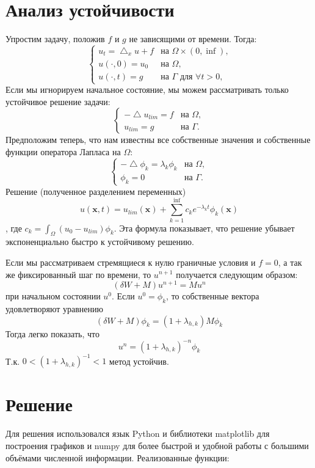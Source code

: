 \documentclass[paper=a4, fontsize=13pt]{scrartcl} %
\numberwithin{equation}{section} %
\numberwithin{figure}{section} %
\numberwithin{table}{section} %
\begin{document}
\section{Анализ устойчивости}
Упростим задачу, положив $f$ и $g$ не зависящими от времени. Тогда:
    \[
        \begin{cases}
            u_t = \bigtriangleup_x u + f& \text{на $\Omega \times (0, \inf)$,} \\
            u(\cdot, 0) = u_0& \text{на $\Omega$}, \\
            u(\cdot, t) = g& \text{на $\Gamma$ для $\forall t > 0$,}
        \end{cases}
    \]
Если мы игнорируем начальное состояние, мы можем рассматривать только устойчивое решение задачи:
    \[
        \begin{cases}
            -\bigtriangleup u_{lim} = f& \text{на $\Omega$}, \\
            u_{lim} = g& \text{на $\Gamma$.}
        \end{cases}
    \]
Предположим теперь, что нам известны все собственные значения и собственные функции оператора Лапласа на $\Omega$:
    \[
        \begin{cases}
            -\bigtriangleup \phi_k = \lambda_k \phi_k& \text{на $\Omega$}, \\
            \phi_k = 0& \text{на $\Gamma$.}
        \end{cases}
    \]
Решение (полученное разделением переменных) $$u(\bm{x}, t) = u_{lim}(\bm{x}) + \sum_{k=1}^{\inf} c_k e^{-\lambda_k t} \phi_k(\bm{x})$$, где $c_k = \int _\Omega (u_0 - u_{lim}) \phi_k$. Эта формула показывает, что решение убывает экспоненциально быстро к устойчивому решению.

Если мы рассматриваем стремящиеся к нулю граничные условия и $f = 0$, а так же фиксированный шаг по времени, то $u^{n+1}$ получается следующим образом: $$(\delta W + M) u^{n+1} = M u^n$$ при начальном состоянии $u^0$. Если $u^0 = \phi_k$, то собственные вектора удовлетворяют уравнению $$(\delta W + M) \phi_k = (1 + \lambda_{h, k}) M \phi_k$$ Тогда легко показать, что $$u^n = (1 + \lambda_{h, k})^{-n} \phi_k$$ Т.к. $0 < (1 + \lambda_{h, k})^{-1} < 1$ метод устойчив.

\section{Решение}
Для решения использовался язык Python и библиотеки matplotlib для построения графиков и numpy для более быстрой и удобной работы с большими объёмами численной информации. Реализованные функции:
\end{document}
